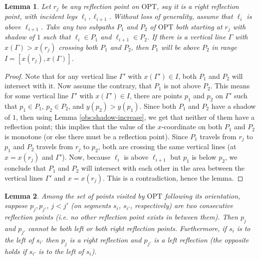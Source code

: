 \documentclass[10pt,a4paper]{amsart}
\theoremstyle{thmstyleone}
\newtheorem{lemma}{Lemma}
\newcommand{\OPT}{{\text{OPT}}}
\begin{document}
\begin{lemma}\label{obs:reflection-paths-above-below}
    Let $r_j$ be any reflection point on $\OPT$, say it is a right reflection point, with incident legs $\ell_i, \ell_{i + 1}$. Without loss of generality, assume that $\ell_i$ is above $\ell_{i + 1}$. Take any two subpaths $P_1$ and $P_2$ of $\OPT$ both starting at $r_j$ with shadow of $1$ such that $\ell_{i}\in P_1$ and $\ell_{i + 1}\in P_2$. 
    If there is a vertical line $\Gamma$ with $x(\Gamma) > x(r_j)$ crossing both $P_1$ and $P_2$, then $P_1$ will be above $P_2$ in range $I = [x(r_j), x(\Gamma)]$.
\end{lemma}

\begin{proof}
    Note that for any vertical line $\Gamma'$ with $x(\Gamma') \in I$, both $P_1$ and $P_2$ will intersect with it.
    Now assume the contrary, that $P_1$ is not above $P_2$. This means for some vertical line $\Gamma'$ with $x(\Gamma') \in I$, there are points $p_1$ and $p_2$ on $\Gamma'$ such that $p_1\in P_1$, $p_2\in P_2$, and $y(p_2) > y(p_1)$. Since both $P_1$ and $P_2$ have a shadow of $1$, then using Lemma \ref{obs:shadow-increase}, we get that neither of them have a reflection point; this implies that the value of the $x$-coordinate on both $P_1$ and $P_2$ is monotone (or else there must be a reflection point). 
    Since $P_1$ travels from $r_j$ to $p_1$ and $P_2$ travels from $r_j$ to $p_2$, both are crossing the same vertical lines (at $x=x(r_j)$ and $\Gamma'$). 
    Now, because $\ell_i$ is above $\ell_{i + 1}$ but $p_1$ is below $p_2$, we conclude that $P_1$ and $P_2$ will intersect with each other in the area between the vertical lines $\Gamma'$ and $x = x(r_j)$. This is a contradiction, hence the lemma.
\end{proof}

	
\begin{lemma}\label{obs:consecutive-reflections}
    Among the set of points visited by $\OPT$ following its orientation, suppose $p_{j},p_{j'}$, $j < j'$ (on segments $s_i$, $s_{i'}$, respectively) are two consecutive reflection points (i.e. no other reflection point exists in between them). Then $p_j$ and 
    $p_{j'}$ cannot be both left or both right reflection points. Furthermore, if $s_i$ is to the left of $s_{i'}$ then $p_j$ is a
    right reflection and $p_{j'}$ is a left reflection (the opposite holds if $s_{i'}$ is to the left of $s_i$).
\end{lemma}
\end{document}
